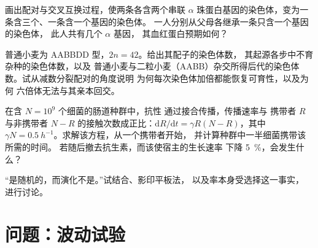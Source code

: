 \begin{exercise}[$\star\star$]\label{exo:b2:genome-diversification:9}
画出配对与交叉互换过程，使两条各含两个串联
$\alpha$ 珠蛋白基因的染色体，变为一条含三个、一条含一个基因的染色体。
一人分别从父母各继承一条只含一个基因的染色体，
此人共有几个 $\alpha$ 基因，
其血红蛋白预期如何？
\end{exercise}

\begin{exercise}[$\star\star\star$]\label{exo:b2:genome-diversification:10}
普通小麦为 AABBDD 型，$2n = 42$。给出其配子的染色体数，
其起源各步中不育杂种的染色体数，以及
普通小麦与二粒小麦（AABB）杂交所得后代的染色体数。试从减数分裂配对的角度说明
为何每次染色体加倍都能恢复可育性，以及为何
六倍体无法与其亲本回交。
\end{exercise}

\begin{exercise}[$\star\star\star$]\label{exo:b2:genome-diversification:11}
在含 $N = 10^{9}$ 个细菌的肠道种群中，抗性
通过接合传播，传播速率与
携带者 $R$ 与非携带者 $N - R$ 的接触次数成正比：$\mathrm{d}R/\mathrm{d}t =
\gamma R (N - R)$，其中 $\gamma N = \qty{0.5}{h^{-1}}$。求解该方程，从一个携带者开始，
并计算种群中一半细菌携带该所需的时间。
若随后撤去抗生素，而该使宿主的生长速率
下降 \qty{5}{\%}，会发生什么？
\end{exercise}

\begin{exercise}[$\star\star\star$]\label{exo:b2:genome-diversification:12}
“是随机的，而演化不是。”试结合、影印平板法，
以及率本身受选择这一事实，
进行讨论。
\end{exercise}

\section{问题：波动试验}

